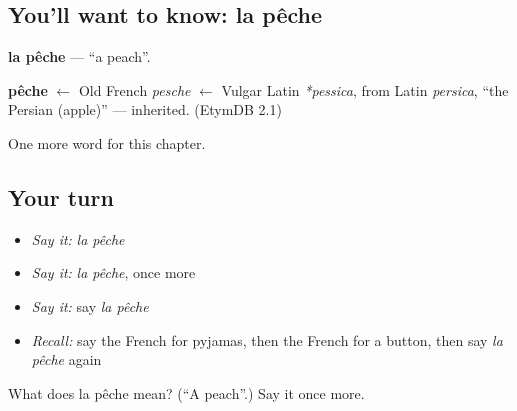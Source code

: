\subsection*{You'll want to know: la pêche}
\textbf{la pêche} — \textquotedblleft{}a peach\textquotedblright{}.

\begin{cousinweb}
\textbf{pêche} $\leftarrow$ Old French \emph{pesche} $\leftarrow$ Vulgar Latin \emph{*pessica}, from Latin \emph{persica}, \textquotedblleft{}the Persian (apple)\textquotedblright{} — inherited. (EtymDB 2.1)
\end{cousinweb}

\begin{grammarlens}[title={What you've built}]
One more word for this chapter.
\end{grammarlens}

\subsection*{Your turn}
\begin{itemize}
\raggedright
  \item \emph{Say it:} \emph{la pêche}
  \item \emph{Say it:} \emph{la pêche}, once more
  \item \emph{Say it:} say \emph{la pêche}
  \item \emph{Recall:} say the French for pyjamas, then the French for a button, then say \emph{la pêche} again
\end{itemize}

\begin{tcolorbox}[breakable,colback=teal!4,colframe=teal!35!black,title={Before you move on}]
What does la pêche mean? (\textquotedblleft{}A peach\textquotedblright{}.) Say it once more.
\end{tcolorbox}
